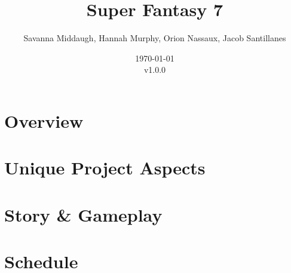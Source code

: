 \documentclass[titlepage]{article}
\title{Super Fantasy 7}
\author{Savanna Middaugh, Hannah Murphy, Orion Nassaux, Jacob Santillanes}
\date{\today\\v1.0.0}
\begin{document}
\maketitle

\section{Overview}

\section{Unique Project Aspects}

\section{Story & Gameplay}

\section{Schedule}
\end{document}

